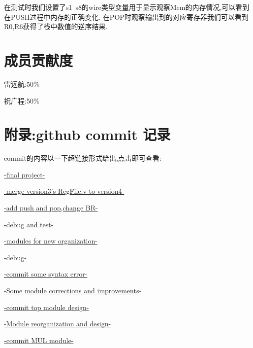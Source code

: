 \documentclass{article}
\begin{document}
在测试时我们设置了s1~s8的wire类型变量用于显示观察Mem的内存情况,可以看到在PUSH过程中内存的正确变化.
在POP时观察输出到的对应寄存器我们可以看到R0,R6获得了栈中数值的逆序结果.




\section{成员贡献度}
雷远航:50$\%$

祝广程:50$\%$


\section{附录:github commit 记录}
commit的内容以一下超链接形式给出,点击即可查看:

\href{https://github.com/lyh031026huahuo1234/FPGA/commit/c23338e3e2d618f0f60e147ae3171259653f18c0}{-final project-} 

\href{https://github.com/lyh031026huahuo1234/FPGA/commit/5dc46de748a9b6c0a2f98d666d9cafa90616ae1c}{-merge version3's RegFile.v to version4-} 

\href{https://github.com/lyh031026huahuo1234/FPGA/commit/8ab835e84b8704036dd17177fd21a39e7fc7dbb3}{-add push and pop,change BR-}

\href{https://github.com/lyh031026huahuo1234/FPGA/commit/6f65d11591ff371db7cb10cd4e8afc1c09ef3051}{-debug and test-}


\href{https://github.com/lyh031026huahuo1234/FPGA/commit/05c2abe0720445d591cb86a88e2cd1ae73d90c9c}{-modules for new organization-}

\href{https://github.com/lyh031026huahuo1234/FPGA/commit/75b1552252936fcbecede27b80b03d2d783391ce}{-debug-}

\href{https://github.com/lyh031026huahuo1234/FPGA/commit/ee0a76e611e4321e34963ad228e82693b8a2db38}{-commit some syntax error-}

\href{https://github.com/lyh031026huahuo1234/FPGA/commit/121aa80b3b038370c69262b26d2ba4924143cab1}{-Some module corrections and improvements-}

\href{https://github.com/lyh031026huahuo1234/FPGA/commit/7aa8c0ca0500cd12a02199083dd7ad8dca750284}{-commit top module design-}

\href{https://github.com/lyh031026huahuo1234/FPGA/commit/035580ca64eb6be3e56a62e0d6f96c69ec52480c}{-Module reorganization and design-}

\href{https://github.com/lyh031026huahuo1234/FPGA/commit/b7df2657a48e5a9d9b2984d78ff0564daa588588}{-commit MUL module-}
\end{document}
